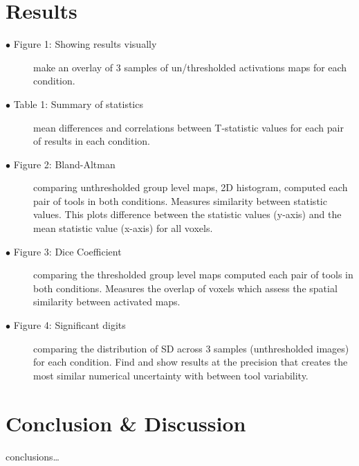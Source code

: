 \documentclass[runningheads]{llncs}
\begin{document}
\section{Results}

\begin{description}
  \item[$\bullet$ Figure 1: Showing results visually] make an overlay of 3 samples of un/thresholded activations maps for each condition.

  \item[$\bullet$ Table 1: Summary of statistics] mean differences and correlations between T-statistic values for each pair of results in each condition.

  \item[$\bullet$ Figure 2: Bland-Altman] comparing unthresholded group level maps, 2D histogram, computed each pair of tools in both conditions.
                  Measures similarity between statistic values.
                  This plots difference between the statistic values (y-axis) and the mean statistic value (x-axis) for all voxels.

  \item[$\bullet$ Figure 3: Dice Coefficient] comparing the thresholded group level maps computed each pair of tools in both conditions.
                  Measures the overlap of voxels which assess the spatial similarity between activated maps. 

  \item[$\bullet$ Figure 4: Significant digits] comparing the distribution of SD across 3 samples (unthresholded images) for each condition. 
                  Find and show results at the precision that creates the most similar numerical uncertainty with between tool variability.  
\end{description}




\section{Conclusion \& Discussion}
conclusions\dots
%
%
%


\end{document}

